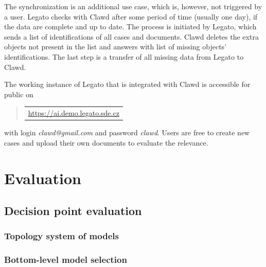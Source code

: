 \documentclass[
  digital, %
  notable,   %
  nolof,     %
  nolot,     %
  draft
]{fithesis3}
\begin{document}
The synchronization is an additional use case, which is, however, not triggered by a user.
Legato checks with Clawd after some period of time (usually one day), if the data are complete and up to date.
The process is initiated by Legato, which sends a list of identifications of all cases and documents.
Clawd deletes the extra objects not present in the list and answers with list of missing objects' identifications.
The last step is a transfer of all missing data from Legato to Clawd.

The working instance of Legato that is integrated with Clawd is accessible for public on 
\begin{quote}
\begin{tabular}{|>{\centering\arraybackslash} m{10cm}|}
\hline
\vspace{2mm}
\url{https://ai.demo.legato.sde.cz}
\vspace{2mm}
\hrulefill
\end{tabular}
\end{quote}
with login \textit{clawd@gmail.com} and password \textit{clawd}.
Users are free to create new cases and upload their own documents to evaluate the relevance.



\chapter{Evaluation}
\label{chp:evaluation}

\section{Decision point evaluation}

\subsection{Topology system of models}

\subsection{Bottom-level model selection}
\label{eval:bottom-model-selection}
\end{document}
